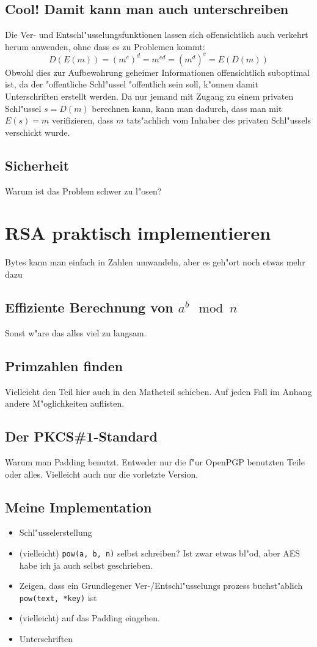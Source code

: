 \documentclass[12pt]{article}
\begin{document}
\subsection{Cool! Damit kann man auch unterschreiben}

Die Ver- und Entschl"usselungsfunktionen lassen sich offensichtlich
auch verkehrt herum anwenden, ohne dass es zu Problemen kommt:
\[D(E(m)) = (m^e)^d = m^{ed} = (m^d)^e = E(D(m))\]
Obwohl dies zur Aufbewahrung geheimer Informationen offensichtlich suboptimal ist,
da der "offentliche Schl"ussel "offentlich sein soll, k"onnen damit Unterschriften erstellt werden.
Da nur jemand mit Zugang zu einem privaten Schl"ussel $s = D(m)$ berechnen kann,
kann man dadurch, dass man mit $E(s) = m$ verifizieren, dass $m$ tats"achlich vom
Inhaber des privaten Schl"ussels verschickt wurde.

\subsection{Sicherheit}
Warum ist das Problem schwer zu l"osen?

\section{RSA praktisch implementieren}
Bytes kann man einfach in Zahlen umwandeln, aber es geh"ort noch etwas mehr dazu
\subsection{Effiziente Berechnung von $a^b \mod n$}
Sonst w"are das alles viel zu langsam.
\subsection{Primzahlen finden}
Vielleicht den Teil hier auch in den Matheteil schieben. Auf jeden Fall im Anhang andere M"oglichkeiten auflisten.
\subsection{Der PKCS\#1-Standard}
Warum man Padding benutzt. Entweder nur die f"ur OpenPGP benutzten Teile oder alles. Vielleicht auch nur die vorletzte Version.
\subsection{Meine Implementation}
\begin{itemize}
\item Schl"usselerstellung
\item (vielleicht) \verb|pow(a, b, n)| selbst schreiben? Ist zwar etwas bl"od, aber AES habe ich ja auch selbst geschrieben.
\item Zeigen, dass ein Grundlegener Ver-/Entschl"usselungs prozess buchst"ablich \verb|pow(text, *key)| ist
\item (vielleicht) auf das Padding eingehen.
\item Unterschriften
\end{itemize}
\end{document}
